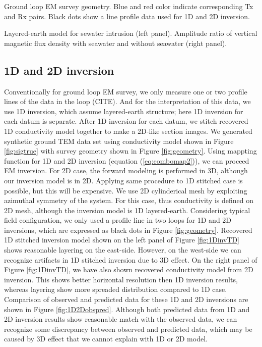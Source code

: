 \documentclass{segabs}
\begin{document}
{Ground loop EM survey geometry. Blue and red color indicate corresponding Tx and Rx pairs. Black dots show a line profile data used for 1D and 2D inversion. }

{Layered-earth model for sewater intrusion (left panel). Amplitude ratio of vertical magnetic flux density with seawater and without seawater (right panel).}

\subsection*{1D and 2D inversion}
Conventionally for ground loop EM survey, we only measure one or two profile lines of the data in the loop (CITE). And for the interpretation of this data, we use 1D inversion, which assume layered-earth structure; here 1D inversion for each datum is separate. After 1D inversion for each datum, we stitch recovered 1D conductivity model together to make a 2D-like section images. We generated synthetic ground TEM data set using conductivity model shown in Figure \ref{fig:sigtrue} with survey geometry shown in Figure \ref{fig:geometry}. Using mappting function for 1D and 2D inversion (equation (\ref{eq:combomap2})), we can proceed EM inversion. For 2D case, the forward modeling is performed in 3D, although our inversion model is in 2D. Applying same procedure to 1D stitched case is possible, but this will be expensive. We use 2D cylinderical mesh by exploiting azimuthal symmetry of the system. For this case, thus conductivity is defined on 2D mesh, although the inversion model is 1D layered-earth.
Considering typical field configuration, we only used a profile line in two loops for 1D and 2D inversions, which are expressed as black dots in Figure \ref{fig:geometry}.
Recovered 1D stitched inversion model shown on the left panel of Figure \ref{fig:1DinvTD} shows reasonable layering on the east-side. However, on the west-side we can recognize artifacts in 1D stitched inversion due to 3D effect. On the right panel of Figure \ref{fig:1DinvTD}, we have also shown recovered conductivity model from 2D inversion. This shows better horizontal resolution then 1D inversion results, whereas layering show more spreaded distribution compared to 1D case. Comparison of observed and predicted data for these 1D and 2D inversions are shown in Figure \ref{fig:1D2Dobspred}. Although both predicted data from 1D and 2D inversion results show reasonable match with the observed data, we can recognize some discrepancy between observed and predicted data, which may be caused by 3D effect that we cannot explain with 1D or 2D model.
\end{document}
